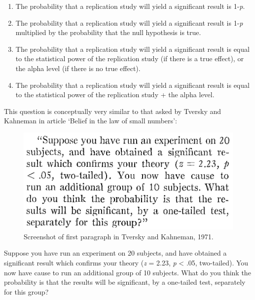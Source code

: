 \documentclass[
  oneside]{krantz}
\providecommand{\tightlist}{%
  \setlength{\itemsep}{0pt}\setlength{\parskip}{0pt}}
\renewenvironment{quote}{\begin{VF}}{\end{VF}}
\begin{document}
\begin{enumerate}
\def\labelenumi{\Alph{enumi})}
\tightlist
\item
  The probability that a replication study will yield a significant result is 1-\emph{p}.
\item
  The probability that a replication study will yield a significant result is 1-\emph{p} multiplied by the probability that the null hypothesis is true.
\item
  The probability that a replication study will yield a significant result is equal to the statistical power of the replication study (if there is a true effect), or the alpha level (if there is no true effect).
\item
  The probability that a replication study will yield a significant result is equal to the statistical power of the replication study + the alpha level.
\end{enumerate}

This question is conceptually very similar to that asked by Tversky and Kahneman \citeyearpar{tversky_belief_1971} in article `Belief in the law of small numbers':



\begin{figure}

{\centering \includegraphics[width=1\linewidth]{images/belieflawsmallnumers} 

}

\caption{Screenshot of first paragraph in Tversky and Kahneman, 1971.}\label{fig:smallnumbers}
\end{figure}

\begin{quote}
Suppose you have run an experiment on 20 subjects, and have obtained a significant result which confirms your theory (\emph{z} = 2.23, \emph{p} \textless{} .05, two-tailed). You now have cause to run an additional group of 10 subjects. What do you think the probability is that the results will be significant, by a one-tailed test, separately for this group?
\end{quote}
\end{document}
